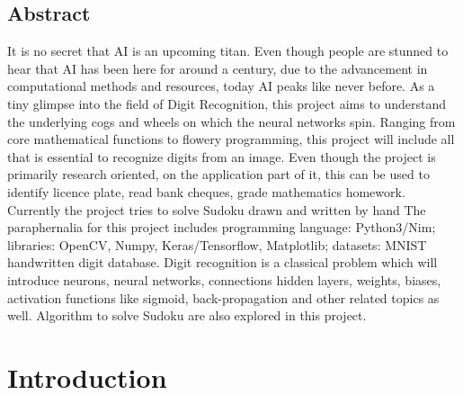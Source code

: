 \documentclass[12pt, a4paper]{report}
\begin{document}
\newpage
\vspace*{\fill}
\begin{center}
    \section*{Abstract}
    \label{sec:abstract}
\end{center}
It is no secret that AI is an upcoming titan. Even though people are stunned to hear that AI has been here for around a century, due to the advancement in computational methods and resources, today AI peaks like never before. As a tiny glimpse into the field of Digit Recognition, this project aims to understand the underlying cogs and wheels on which the neural networks spin. Ranging from core mathematical functions to flowery programming, this project will include all that is essential to recognize digits from an image. Even though the project is primarily research oriented, on the application part of it, this can be used to identify licence plate, read bank cheques, grade mathematics homework. Currently the project tries to solve Sudoku drawn and written by hand The paraphernalia for this project includes programming language: Python3/Nim; libraries: OpenCV, Numpy, Keras/Tensorflow, Matplotlib; datasets: MNIST handwritten digit database. Digit recognition is a classical problem which will introduce neurons, neural networks, connections hidden layers, weights, biases, activation functions like sigmoid, back-propagation and other related topics as well. Algorithm to solve Sudoku are also explored in this project.
\vspace*{\fill}

{
    \hypersetup{hidelinks}

    \tableofcontents
    \thispagestyle{fancy}

    \listoffigures
    \thispagestyle{fancy}

}

\chapter{Introduction}
\label{chap:introduction}
\thispagestyle{fancy}
\end{document}
